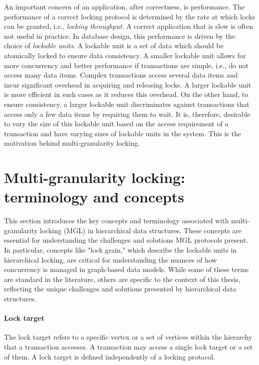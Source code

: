 An important concern of an application, after correctness, is performance. The performance of a correct locking protocol is determined by the rate at which locks can be granted, i.e., \emph{locking throughput}. A correct application that is slow is often not useful in practice. In database design, this performance is driven by the choice of \emph{lockable units}. A lockable unit is a set of data which should be atomically locked to ensure data consistency. A smaller lockable unit allows for more concurrency and better performance if transactions are simple, i.e., do not access many data items. Complex transactions access several data items and incur significant overhead in acquiring and releasing locks. A larger lockable unit is more efficient in such cases as it reduces this overhead.
On the other hand, to ensure consistency, a larger lockable unit discriminates against transactions that access only a few data items by requiring them to wait. It is, therefore, desirable to vary the size of this lockable unit based on the access requirement of a transaction and have varying sizes of lockable units in the system. This is the motivation behind multi-granularity locking. 

\section{Multi-granularity locking: terminology and concepts}
This section introduces the key concepts and terminology associated with multi-granularity locking (MGL) in hierarchical data structures. These concepts are essential for understanding the challenges and solutions MGL protocols present.
In particular, concepts like "lock grain," which describe the lockable units in hierarchical locking, are critical for understanding the nuances of how concurrency is managed in graph-based data models. While some of these terms are standard in the literature, others are specific to the context of this thesis, reflecting the unique challenges and solutions presented by hierarchical data structures.


\paragraph{Lock target} The lock target refers to a specific vertex or a set of vertices within the hierarchy that a transaction accesses. A transaction may access a single lock target or a set of them. A lock target is defined independently of a locking protocol.  

